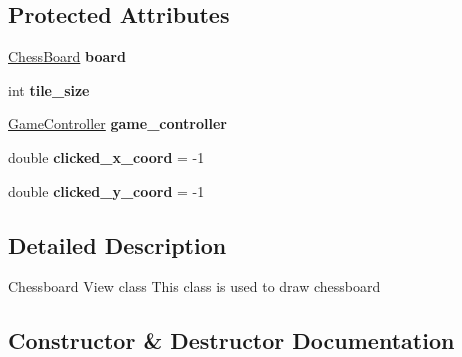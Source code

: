 \subsection*{Protected Attributes}
\begin{DoxyCompactItemize}
\item 
\hypertarget{classchess_1_1_chessboard___view_a9672d977ec1b62b2d9f4a47035c8132a}{}\hyperlink{classchessboard_1_1_chess_board}{Chess\+Board} {\bfseries board}\label{classchess_1_1_chessboard___view_a9672d977ec1b62b2d9f4a47035c8132a}

\item 
\hypertarget{classchess_1_1_chessboard___view_aa4fc1ec2f50b04614b0a7fe23a49d6dd}{}int {\bfseries tile\+\_\+size}\label{classchess_1_1_chessboard___view_aa4fc1ec2f50b04614b0a7fe23a49d6dd}

\item 
\hypertarget{classchess_1_1_chessboard___view_ad23b8076d6da9841122d29cca79a99c8}{}\hyperlink{classchess_1_1_game_controller}{Game\+Controller} {\bfseries game\+\_\+controller}\label{classchess_1_1_chessboard___view_ad23b8076d6da9841122d29cca79a99c8}

\item 
\hypertarget{classchess_1_1_chessboard___view_a37099dff3f03c778c3ba348e4cd46536}{}double {\bfseries clicked\+\_\+x\+\_\+coord} = -\/1\label{classchess_1_1_chessboard___view_a37099dff3f03c778c3ba348e4cd46536}

\item 
\hypertarget{classchess_1_1_chessboard___view_a25bc9c5c75ed9926655598a6cd0eced7}{}double {\bfseries clicked\+\_\+y\+\_\+coord} = -\/1\label{classchess_1_1_chessboard___view_a25bc9c5c75ed9926655598a6cd0eced7}

\end{DoxyCompactItemize}


\subsection{Detailed Description}
Chessboard View class This class is used to draw chessboard 

\subsection{Constructor \& Destructor Documentation}
\hypertarget{classchess_1_1_chessboard___view_a603a5829216277fc2987cae53e7cfff0}{}

